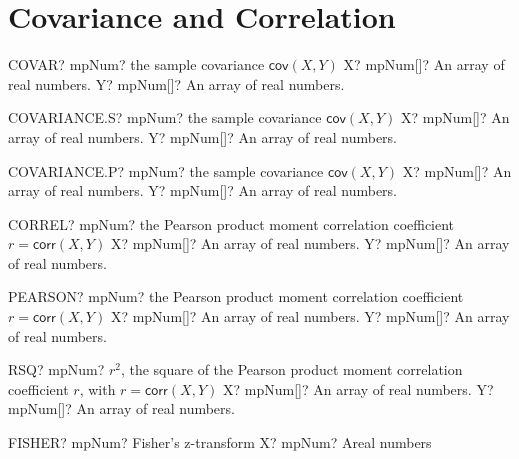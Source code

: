 \documentclass[12pt,a4paper,openany]{book}
\begin{document}
\section{Covariance and Correlation}

\begin{mpFunctionsExtract}
\mpWorksheetFunctionTwoNotImplemented
{COVAR? mpNum? the sample covariance $\textsf{cov}(X,Y)$}
{X? mpNum[]? An array of real numbers.}
{Y? mpNum[]? An array of real numbers.}
\end{mpFunctionsExtract}

\begin{mpFunctionsExtract}
\mpWorksheetFunctionTwoNotImplemented
{COVARIANCE.S? mpNum? the sample covariance $\textsf{cov}(X,Y)$}
{X? mpNum[]? An array of real numbers.}
{Y? mpNum[]? An array of real numbers.}
\end{mpFunctionsExtract}

\begin{mpFunctionsExtract}
\mpWorksheetFunctionTwoNotImplemented
{COVARIANCE.P? mpNum? the sample covariance $\textsf{cov}(X,Y)$}
{X? mpNum[]? An array of real numbers.}
{Y? mpNum[]? An array of real numbers.}
\end{mpFunctionsExtract}

\begin{mpFunctionsExtract}
\mpWorksheetFunctionTwoNotImplemented
{CORREL? mpNum? the Pearson product moment correlation coefficient  $r = \textsf{corr}(X,Y)$}
{X? mpNum[]? An array of real numbers.}
{Y? mpNum[]? An array of real numbers.}
\end{mpFunctionsExtract}

\begin{mpFunctionsExtract}
\mpWorksheetFunctionTwoNotImplemented
{PEARSON? mpNum? the Pearson product moment correlation coefficient  $r = \textsf{corr}(X,Y)$}
{X? mpNum[]? An array of real numbers.}
{Y? mpNum[]? An array of real numbers.}
\end{mpFunctionsExtract}

\begin{mpFunctionsExtract}
\mpWorksheetFunctionTwoNotImplemented
{RSQ? mpNum? $r^2$, the square of the Pearson product moment correlation coefficient $r$, with $r = \textsf{corr}(X,Y)$}
{X? mpNum[]? An array of real numbers.}
{Y? mpNum[]? An array of real numbers.}
\end{mpFunctionsExtract}

\begin{mpFunctionsExtract}
\mpWorksheetFunctionOneNotImplemented
{FISHER? mpNum? Fisher's z-transform}
{X? mpNum? Areal numbers}
\end{mpFunctionsExtract}
\end{document}
